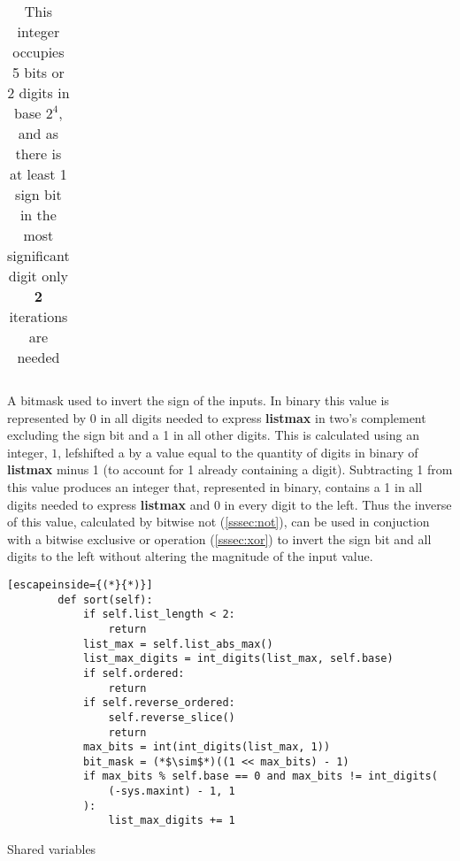 \documentclass[12pt]{article}
\begin{document}
\begin{description}
\begin{table}[!htb]
\begin{minipage}{.45\textwidth}
\begin{tabular}[t]{cccc}
				\end{tabular}%
				\vspace{0.1cm}
				\caption*{This integer occupies 5 bits or 2 digits in base $2^4$, and as there is at least 1 sign bit in the most significant digit only \textbf{2} iterations are needed}
			\end{minipage}\hfill%
		
		\end{table}

		\item[bit\textunderscore mask] A bitmask used to invert the sign of the inputs. In binary this value is represented by 0 in all digits needed to express \textbf{list\textunderscore max} in two's complement excluding the sign bit and a 1 in all other digits. This is calculated using an integer, $1$, lefshifted a by a value equal to the quantity of digits in binary of \textbf{list\textunderscore max} minus 1 (to account for 1 already containing a digit). Subtracting 1 from this value produces an integer that, represented in binary, contains a 1 in all digits needed to express \textbf{list\textunderscore max} and 0 in every digit to the left. Thus the inverse of this value, calculated by bitwise not (\ref{sssec:not}), can be used in conjuction with a bitwise exclusive or operation (\ref{sssec:xor}) to invert the sign bit and all digits to the left without altering the magnitude of the input value.
	\end{description}
	\begin{table}[H]
		\lstset{
			language=python,
		numbers=left,
		stepnumber=1,
		showstringspaces=false,
		tabsize=3,
		breaklines=true,
		breakatwhitespace=false,}
		\centering
		\begin{lstlisting}[escapeinside={(*}{*)}]
		def sort(self):
			if self.list_length < 2:
				return
			list_max = self.list_abs_max()
			list_max_digits = int_digits(list_max, self.base)
			if self.ordered:
				return
			if self.reverse_ordered:
				self.reverse_slice()
				return
			max_bits = int(int_digits(list_max, 1))
			bit_mask = (*$\sim$*)((1 << max_bits) - 1)
			if max_bits % self.base == 0 and max_bits != int_digits(
				(-sys.maxint) - 1, 1
			):
				list_max_digits += 1
		\end{lstlisting}
		\caption*{Shared variables}
		\end{table}
\end{document}
